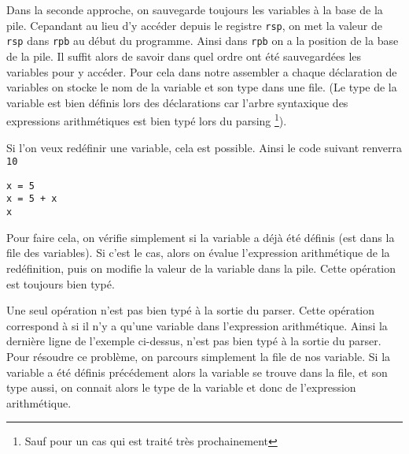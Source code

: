 \documentclass[12pt]{article}
\begin{document}
Dans la seconde approche, on sauvegarde toujours les variables à la base de la pile. Cepandant au lieu d'y accéder depuis le registre 
\verb|rsp|, on met la valeur de \verb|rsp| dans \verb|rpb| au début du programme. Ainsi dans \verb|rpb| on a la position de la base de la pile. Il 
suffit alors de savoir dans quel ordre ont été sauvegardées les variables pour y accéder.
Pour cela dans notre assembler a chaque déclaration de variables on stocke le nom de la variable et son type dans une file.
(Le type de la variable est bien définis lors des déclarations car l'arbre syntaxique des expressions arithmétiques est bien typé 
lors du parsing \footnote{Sauf pour un cas qui est traité très prochainement}).

Si l'on veux redéfinir une variable, cela est possible. Ainsi le code suivant renverra \verb|10|
\begin{verbatim}
x = 5
x = 5 + x
x
\end{verbatim}

Pour faire cela, on vérifie simplement si la variable a déjà été définis (est dans la file des variables).
Si c'est le cas, alors on évalue l'expression arithmétique de la redéfinition, puis on modifie la valeur de la variable dans la pile.
Cette opération est toujours bien typé.


Une seul opération n'est pas bien typé à la sortie du parser. Cette opération correspond à si il n'y a qu'une variable dans l'expression 
arithmétique. Ainsi la dernière ligne de l'exemple ci-dessus, n'est pas bien typé à la sortie du parser. Pour résoudre ce problème,
on parcours simplement la file de nos variable. Si la variable a été définis précédement alors la variable se trouve dans la file,
et son type aussi, on connait alors le type de la variable et donc de l'expression arithmétique.
\end{document}
